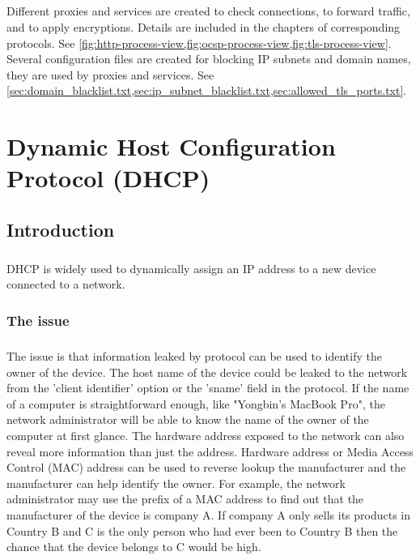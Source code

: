 \documentclass[mscthesis]{usiinfthesis}
\begin{document}
\paragraph{}
Different proxies and services are created to check connections, to forward traffic, and to apply encryptions. Details are included in the chapters of corresponding protocols. See \cref{fig:http-process-view,fig:ocsp-process-view,fig:tls-process-view}. Several configuration files are created for blocking IP subnets and domain names, they are used by proxies and services. See \cref{sec:domain_blacklist.txt,sec:ip_subnet_blacklist.txt,sec:allowed_tls_ports.txt}.

\chapter{Dynamic Host Configuration Protocol (DHCP)}\label{cha:dhcp}

\section{Introduction}
\paragraph{}
DHCP is widely used to dynamically assign an IP address to a new device connected to a network.

\subsection{The issue}
\paragraph{}
The issue is that information leaked by protocol can be used to identify the owner of the device. The host name of the device could be leaked to the network from the 'client identifier' option or the 'sname' field in the protocol.\citep{rfc:dhcp} If the name of a computer is straightforward enough, like "Yongbin's MacBook Pro", the network administrator will be able to know the name of the owner of the computer at first glance. The hardware address exposed to the network can also reveal more information than just the address. Hardware address or Media Access Control (MAC) address can be used to reverse lookup the manufacturer and the manufacturer can help identify the owner. For example, the network administrator may use the prefix of a MAC address to find out that the manufacturer of the device is company A. If company A only sells its products in Country B and C is the only person who had ever been to Country B then the chance that the device belongs to C would be high.
\end{document}
